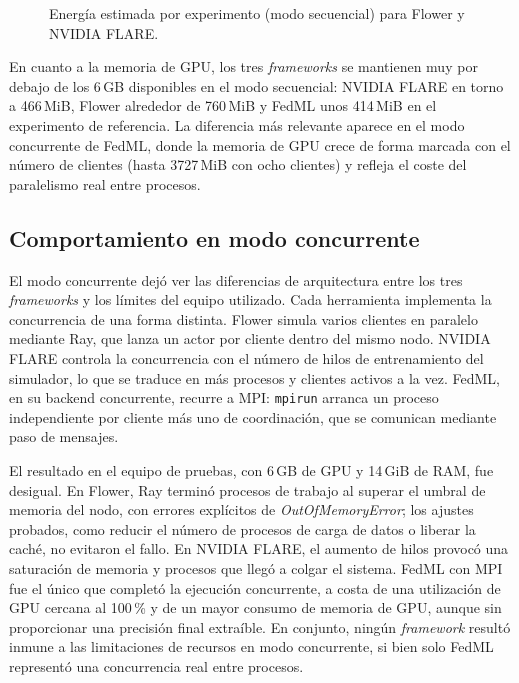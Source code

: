 \begin{figure}[htbp]
  \centering
  \caption{Energía estimada por experimento (modo secuencial) para Flower y NVIDIA FLARE.}
  \label{fig:comp-energia}
\end{figure}

En cuanto a la memoria de GPU, los tres \textit{frameworks} se mantienen muy por debajo de los
6\,GB disponibles en el modo secuencial: NVIDIA FLARE en torno a 466\,MiB, Flower alrededor de
760\,MiB y FedML unos 414\,MiB en el experimento de referencia. La diferencia más relevante
aparece en el modo concurrente de FedML, donde la memoria de GPU crece de forma marcada con el
número de clientes (hasta 3727\,MiB con ocho clientes) y refleja el coste del paralelismo real
entre procesos.

\subsection{Comportamiento en modo concurrente}\label{sec:concurrencia}

El modo concurrente dejó ver las diferencias de arquitectura entre los tres \textit{frameworks}
y los límites del equipo utilizado. Cada herramienta implementa la concurrencia de una forma
distinta. Flower simula varios clientes en paralelo mediante Ray, que
lanza un actor por cliente dentro del mismo nodo. NVIDIA FLARE controla la concurrencia con el
número de hilos de entrenamiento del simulador, lo que se traduce en más procesos y clientes
activos a la vez. FedML, en su backend concurrente, recurre a MPI: \texttt{mpirun} arranca un
proceso independiente por cliente más uno de coordinación, que se comunican mediante paso de
mensajes.

El resultado en el equipo de pruebas, con 6\,GB de GPU y 14\,GiB de RAM, fue desigual. En Flower,
Ray terminó procesos de trabajo al superar el umbral de memoria del nodo, con errores explícitos
de \textit{OutOfMemoryError}; los ajustes probados, como reducir el número de procesos de carga
de datos o liberar la caché, no evitaron el fallo. En NVIDIA FLARE, el aumento de hilos provocó
una saturación de memoria y procesos que llegó a colgar el sistema. FedML con MPI fue el único
que completó la ejecución concurrente, a costa de una utilización de GPU cercana al 100\,\% y de
un mayor consumo de memoria de GPU, aunque sin proporcionar una precisión final extraíble. En
conjunto, ningún \textit{framework} resultó inmune a las limitaciones de recursos en modo
concurrente, si bien solo FedML representó una concurrencia real entre procesos.

